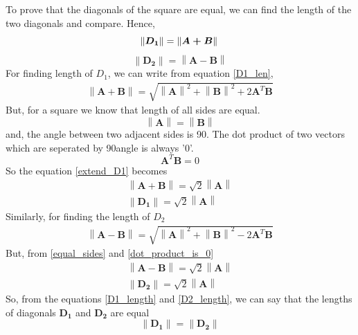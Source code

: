 \documentclass[journal,12pt,twocolumn]{article}
\providecommand{\norm}[1]{\left\lVert#1\right\rVert}
\begin{document}
To prove that the diagonals of the square are equal, we can find the length of the two diagonals and compare. Hence,
\begin{equation}
\norm {\boldsymbol{D_1}}  = \norm {\boldsymbol{A + B}}\\
	\label{D1_len}
\end{equation}
\begin{equation}
\norm {\boldsymbol{D_2}}  = \norm {\boldsymbol{A - B}}
	\label{D2_len}
\end{equation}
For finding length of $D_1$, we can write from equation \eqref{D1_len},  
\begin{align}
	\norm{\boldsymbol{A + B}} = \sqrt{\norm{\boldsymbol{A}}^2 + \norm{\boldsymbol{B}}^2 + 2\boldsymbol{A}^T\boldsymbol{B}}
	\label{extend_D1}
\end{align}
But, for a square we know that length of all sides are equal.
\begin{equation}
	\norm {\boldsymbol{A}} = \norm{\boldsymbol{B}}
	\label{equal_sides}
\end{equation}
and, the angle between two adjacent sides is 90\degree. The dot product of two vectors which are seperated by 90\degree angle is always '0'. 
\begin{equation}
	\boldsymbol{A}^T\boldsymbol{B} = 0 
	\label{dot_product_is_0}
\end{equation}
So the equation \eqref{extend_D1} becomes 
\begin{align}
	\norm {\boldsymbol{A + B}} = \sqrt{2}\norm{\boldsymbol{A}}\\
	\norm {\boldsymbol{D_1}} = \sqrt{2}\norm{\boldsymbol{A}} 
	\label{D1_length}
\end{align}
Similarly, for finding the length of $D_2$ 
\begin{align}
	\norm {\boldsymbol{A - B}} = \sqrt{\norm{\boldsymbol{A}}^2 + \norm{\boldsymbol{B}}^2 - 2\boldsymbol{A}^T\boldsymbol{B}}
\end{align}
But, from \eqref{equal_sides} and \eqref{dot_product_is_0}
\begin{align}
	\norm {\boldsymbol{A - B}} = \sqrt{2}\norm{\boldsymbol{A}}\\
	\norm {\boldsymbol{D_2}} = \sqrt{2}\norm{\boldsymbol{A}} 
	\label{D2_length}
\end{align}
So, from the equations \eqref{D1_length} and \eqref{D2_length}, we can say that the lengths of diagonals $\boldsymbol{D_1}$ and $\boldsymbol{D_2}$ are equal 
\begin{equation}
	\norm{\boldsymbol{D_1}} = \norm{\boldsymbol{D_2}}
\end{equation}
\end{document}
